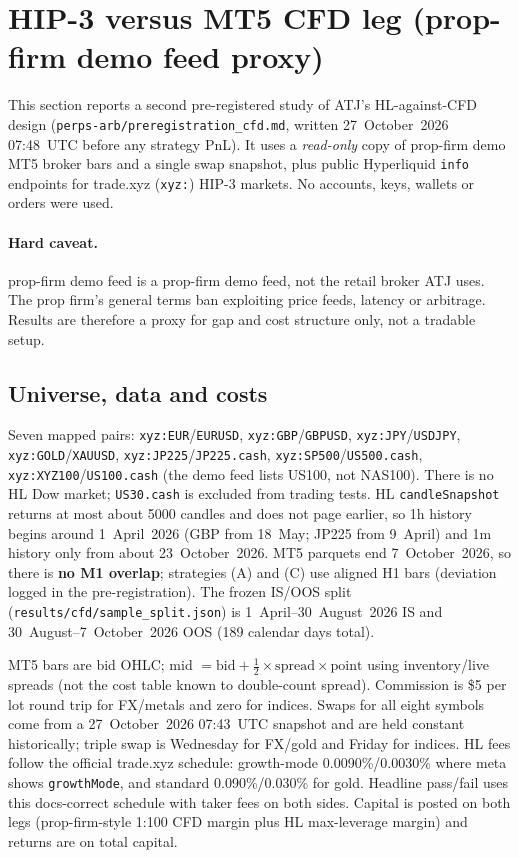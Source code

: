 \documentclass[11pt,a4paper]{article}
\begin{document}
\section{HIP-3 versus MT5 CFD leg (prop-firm demo feed proxy)}
\label{sec:cfd}

This section reports a second pre-registered study of ATJ's HL-against-CFD design
(\texttt{perps-arb/preregistration\_cfd.md}, written 27~October~2026 07:48~UTC before any strategy PnL).
It uses a \emph{read-only} copy of prop-firm demo MT5 broker bars and a single swap snapshot, plus public Hyperliquid
\texttt{info} endpoints for trade.xyz (\texttt{xyz:}) HIP-3 markets. No accounts, keys, wallets or orders were used.

\paragraph{Hard caveat.}
prop-firm demo feed is a prop-firm demo feed, not the retail broker ATJ uses.
The prop firm's general terms ban exploiting price feeds, latency or arbitrage.
Results are therefore a proxy for gap and cost structure only, not a tradable setup.

\subsection{Universe, data and costs}
Seven mapped pairs: \texttt{xyz:EUR}/\texttt{EURUSD}, \texttt{xyz:GBP}/\texttt{GBPUSD},
\texttt{xyz:JPY}/\texttt{USDJPY}, \texttt{xyz:GOLD}/\texttt{XAUUSD},
\texttt{xyz:JP225}/\texttt{JP225.cash}, \texttt{xyz:SP500}/\texttt{US500.cash},
\texttt{xyz:XYZ100}/\texttt{US100.cash} (the demo feed lists US100, not NAS100).
There is no HL Dow market; \texttt{US30.cash} is excluded from trading tests.
HL \texttt{candleSnapshot} returns at most about 5000 candles and does not page earlier, so
1h history begins around 1~April~2026 (GBP from 18~May; JP225 from 9~April) and 1m history only from about 23~October~2026.
MT5 parquets end 7~October~2026, so there is \textbf{no M1 overlap}; strategies (A) and (C) use aligned H1 bars
(deviation logged in the pre-registration).
The frozen IS/OOS split (\texttt{results/cfd/sample\_split.json}) is 1~April--30~August~2026 IS and
30~August--7~October~2026 OOS (189 calendar days total).

MT5 bars are bid OHLC; mid $= \mathrm{bid} + \tfrac12\times\mathrm{spread}\times\mathrm{point}$
using inventory/live spreads (not the cost table known to double-count spread).
Commission is \$5 per lot round trip for FX/metals and zero for indices.
Swaps for all eight symbols come from a 27~October~2026 07:43~UTC snapshot and are held constant historically;
triple swap is Wednesday for FX/gold and Friday for indices.
HL fees follow the official trade.xyz schedule: growth-mode 0.0090\%/0.0030\% where meta shows
\texttt{growthMode}, and standard 0.090\%/0.030\% for gold.
Headline pass/fail uses this docs-correct schedule with taker fees on both sides.
Capital is posted on both legs (prop-firm-style 1:100 CFD margin plus HL max-leverage margin) and returns are on total capital.
\end{document}
